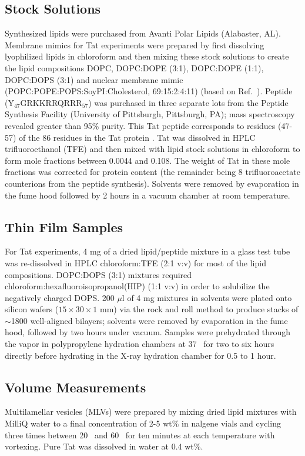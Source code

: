 \subsection{Stock Solutions}
Synthesized lipids were purchased from Avanti Polar Lipids (Alabaster, AL). 
Membrane mimics for Tat experiments were prepared by first 
dissolving lyophilized lipids in chloroform and then mixing these stock 
solutions to create the lipid compositions
DOPC, DOPC:DOPE (3:1), DOPC:DOPE (1:1), DOPC:DOPS (3:1) and nuclear membrane
mimic (POPC:POPE:POPS:SoyPI:Cholesterol, 69:15:2:4:11) (based on Ref.~\cite{Jarasch73}). 
Peptide (Y$_{47}$GRKKRRQRRR$_{57}$) was purchased in three separate lots from the 
Peptide Synthesis Facility (University of Pittsburgh, Pittsburgh, PA); 
mass spectroscopy revealed greater than 95\% purity. 
This Tat peptide corresponds to residues (47-57) of the 86 residues in the Tat 
protein \cite{Vives97}. 
Tat was dissolved in HPLC trifluoroethanol (TFE) and then mixed with lipid 
stock solutions in chloroform to form mole fractions between 0.0044 and 0.108. 
The weight of Tat in these mole fractions was corrected for protein content 
(the remainder being 8 trifluoroacetate counterions from the peptide synthesis). 
Solvents were removed by evaporation in the fume hood followed
by 2 hours in a vacuum chamber at room temperature.

\subsection{Thin Film Samples}
For Tat experiments, 4 mg of a dried lipid/peptide mixture 
in a glass test tube was re-dissolved 
in HPLC chloroform:TFE (2:1 v:v) for most of the lipid compositions. 
DOPC:DOPS (3:1) mixtures required chloroform:hexafluoroisopropanol(HIP) (1:1 v:v) in order to 
solubilize the negatively charged DOPS. 200 $\mu$l of 4 mg mixtures in 
solvents were plated onto silicon wafers ($15\times 30\times 1$ mm) via 
the rock and roll method \cite{Tristram-Nagle07_MMB} 
to produce stacks of $\sim$1800 well-aligned 
bilayers; solvents were removed by evaporation in the fume hood, followed by 
two hours under vacuum. Samples were prehydrated through the
vapor in polypropylene hydration chambers at 37 \textcelsius\ for two to six 
hours directly before hydrating in the X-ray hydration chamber 
\cite{Kucerka05_BPJ} for 0.5 to 1 hour. 

\subsection{Volume Measurements}\label{sec:volume_method}
Multilamellar vesicles (MLVs) were prepared by mixing dried lipid mixtures with 
MilliQ water to a final concentration of 2-5 wt\% in nalgene vials and cycling 
three times between 20 \textcelsius\ and 60 \textcelsius\ for ten minutes at 
each temperature with vortexing. Pure Tat was dissolved in water at 0.4 wt\%.


